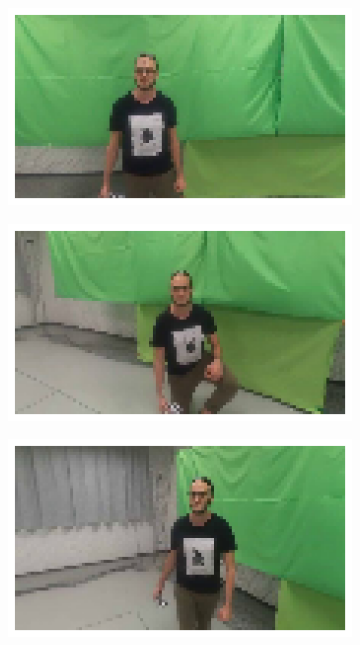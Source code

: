 \begin{figure}[!h]
	\begin{center}
		\begin{subfigure}[h]{0.24\textwidth}
			\centering
			\includegraphics[width=1\textwidth]{"contents/images/04-greenscreen-1"}
		\end{subfigure}
		\hfill
		\begin{subfigure}[h]{0.24\textwidth}
			\centering
			\includegraphics[width=1\textwidth]{"contents/images/04-greenscreen-2"}
		\end{subfigure}
		\hfill
		\begin{subfigure}[h]{0.24\textwidth}
			\centering
			\includegraphics[width=1\textwidth]{"contents/images/04-greenscreen-3"}

\end{subfigure}
\end{center}
\end{figure}
